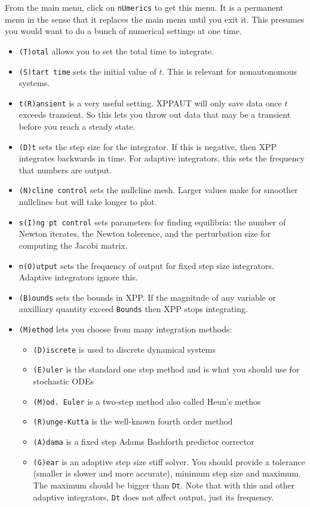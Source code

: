 \documentclass{article}
\begin{document}
\bigskip

From the main menu, click on {\tt nUmerics} to get this menu. It is a permanent menu in the sense that it replaces the main menu until you exit it. This presumes you would want to do a bunch of numerical settings at one time.
\begin{itemize}
\item {\tt (T)otal} allows you to set the total time to integrate. 
\item {\tt (S)tart time} sets the initial value of $t$. This is relevant for nonautonomous systems.
\item {\tt t(R)ansient} is a very useful setting. XPPAUT will only save data once $t$ exceeds transient. So this lets you throw out data  that may be a transient before you reach a steady state.
\item {\tt (D)t} sets the step size for the integrator. If this is negative, then XPP integrates backwards in time. For adaptive integrators, this sets the frequency that numbers are output.
\item{\tt (N)cline control} sets the nullcline mesh. Larger values make for smoother nullclines but will take longer to plot.
\item{\tt s(I)ng pt control} sets parameters for finding equilibria: the number of Newton iterates, the Newton tolerence, and the perturbation size for computing the Jacobi matrix.
\item{\tt n(O)utput} sets the frequency of output for fixed step size integrators. Adaptive integrators ignore this.
\item{\tt (B)ounds} sets the bounds in XPP. If the magnitude of any variable or auxilliary quantity exceed {\tt Bounds} then XPP stops integrating.
\item {\tt (M)ethod} lets you choose from many integration methods:
\begin{itemize}
\item {\tt (D)iscrete} is used to discrete dynamical systems
\item {\tt (E)uler} is the standard one step method and is what you should use for stochastic ODEs
\item {\tt (M)od. Euler} is a two-step method also called Heun's methos
\item {\tt (R)unge-Kutta} is the well-known fourth order method
\item {\tt (A)dama} is a fixed step Adams Bashforth predictor corrector
\item {\tt (G)ear} is an adaptive step size stiff solver. You should provide a tolerance (smaller is slower and more accurate), minimum step size and maximum. The maximum should be bigger than {\tt Dt}. Note that with this and other adaptive integrators, {\tt Dt} does not affect output, just its frequency.

\end{itemize}
\end{itemize}
\end{document}
